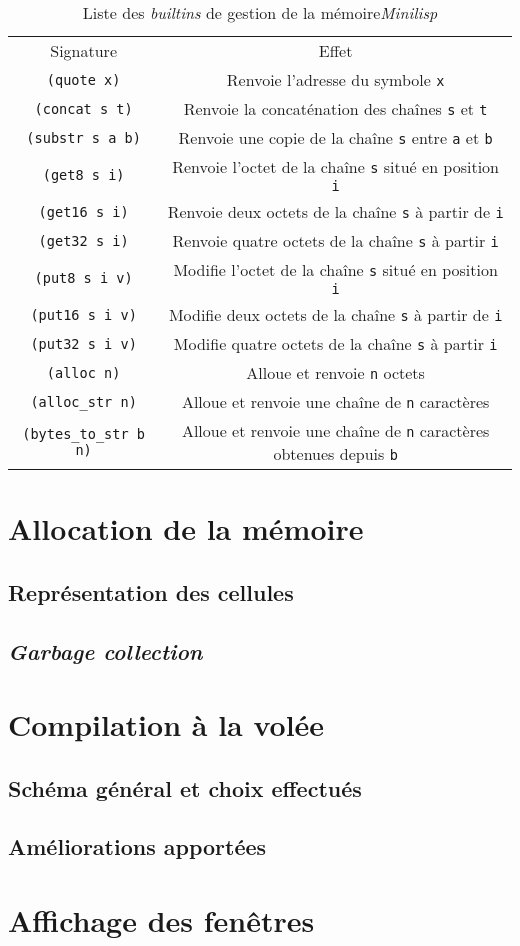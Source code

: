 \documentclass[a4paper, 10pt, french]{article}
\newcommand{\codeLisp}[1]{\texttt{#1}}
\newcommand{\foreign}[1]{\emph{#1}}
\begin{document}
\begin{table}[H]
  \centering
  \begin{tabularx}{\linewidth}{|C|C|}
    \hline
    Signature & Effet \tabularnewline
    \hhline{|=|=|}
    \codeLisp{(quote x)} & Renvoie l'adresse du symbole \codeLisp{x} \tabularnewline
    \hline
    \codeLisp{(concat s t)} & Renvoie la concaténation des chaînes \codeLisp{s} et \codeLisp{t} \tabularnewline
    \hline
    \codeLisp{(substr s a b)} & Renvoie une copie de la chaîne \codeLisp{s} entre \codeLisp{a} et \codeLisp{b} \tabularnewline
    \hhline{|=|=|}
    \codeLisp{(get8 s i)} & Renvoie l'octet de la chaîne \codeLisp{s} situé en position \codeLisp{i} \tabularnewline
    \hline
    \codeLisp{(get16 s i)} & Renvoie deux octets de la chaîne \codeLisp{s} à partir de \codeLisp{i} \tabularnewline
    \hline
    \codeLisp{(get32 s i)} & Renvoie quatre octets de la chaîne \codeLisp{s} à partir \codeLisp{i} \tabularnewline
    \hline
    \codeLisp{(put8 s i v)} & Modifie l'octet de la chaîne \codeLisp{s} situé en position \codeLisp{i} \tabularnewline
    \hline
    \codeLisp{(put16 s i v)} & Modifie deux octets de la chaîne \codeLisp{s} à partir de \codeLisp{i} \tabularnewline
    \hline
    \codeLisp{(put32 s i v)} & Modifie quatre octets de la chaîne \codeLisp{s} à partir \codeLisp{i} \tabularnewline
    \hhline{|=|=|}
    \codeLisp{(alloc n)} & Alloue et renvoie \codeLisp{n} octets \tabularnewline
    \hline
    \codeLisp{(alloc_str n)} & Alloue et renvoie une chaîne de \codeLisp{n} caractères \tabularnewline
    \hline
    \codeLisp{(bytes_to_str b n)} & Alloue et renvoie une chaîne de \codeLisp{n} caractères obtenues depuis \codeLisp{b} \tabularnewline
    \hline
  \end{tabularx}
  \caption{Liste des \foreign{builtins} de gestion de la mémoire\foreign{Minilisp}}
\end{table}


\section{Allocation de la mémoire}

\subsection{Représentation des cellules}

\subsection{\foreign{Garbage collection}}


\section{Compilation à la volée}

\subsection{Schéma général et choix effectués}

\subsection{Améliorations apportées}


\section{Affichage des fenêtres}
\end{document}
